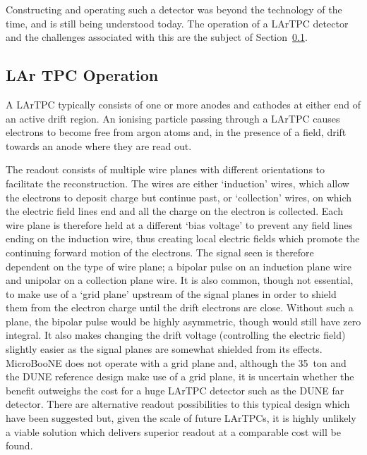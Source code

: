 Constructing and operating such a detector was beyond the technology of the time, and is still being understood today.  The operation of a LArTPC detector and the challenges associated with this are the subject of Section~\ref{sec:LArTPCOperation}.

\subsection{LAr TPC Operation}\label{sec:LArTPCOperation}

A LArTPC typically consists of one or more anodes and cathodes at either end of an active drift region.  An ionising particle passing through a LArTPC causes electrons to become free from argon atoms and, in the presence of a field, drift towards an anode where they are read out.

The readout consists of multiple wire planes with different orientations to facilitate the reconstruction.  The wires are either `induction' wires, which allow the electrons to deposit charge but continue past, or `collection' wires, on which the electric field lines end and all the charge on the electron is collected.  Each wire plane is therefore held at a different `bias voltage' to prevent any field lines ending on the induction wire, thus creating local electric fields which promote the continuing forward motion of the electrons.  The signal seen is therefore dependent on the type of wire plane; a bipolar pulse on an induction plane wire and unipolar on a collection plane wire.  It is also common, though not essential, to make use of a `grid plane' upstream of the signal planes in order to shield them from the electron charge until the drift electrons are close.  Without such a plane, the bipolar pulse would be highly asymmetric, though would still have zero integral.  It also makes changing the drift voltage (controlling the electric field) slightly easier as the signal planes are somewhat shielded from its effects.  MicroBooNE does not operate with a grid plane and, although the 35~ton and the DUNE reference design make use of a grid plane, it is uncertain whether the benefit outweighs the cost for a huge LArTPC detector such as the DUNE far detector.  There are alternative readout possibilities to this typical design which have been suggested but, given the scale of future LArTPCs, it is highly unlikely a viable solution which delivers superior readout at a comparable cost will be found.

